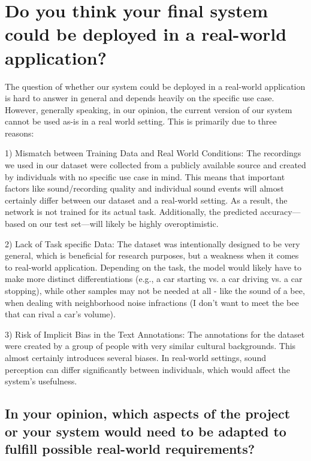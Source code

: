 
\section{Do you think your final system could be deployed in a real-world application?}
\label{sec:real-world application}


The question of whether our system could be deployed in a real-world application is hard to answer in general and depends heavily on the specific use case. However, generally speaking, in our opinion, the current version of our system cannot be used as-is in a real world setting. This is primarily due to three reasons:

1) Mismatch between Training Data and Real World Conditions:
\newline
The recordings we used in our dataset were collected from a publicly available source and created by individuals with no specific use case in mind. This means that important factors like sound/recording quality and individual sound events will almost certainly differ between our dataset and a real-world setting. As a result, the network is not trained for its actual task. Additionally, the predicted accuracy—based on our test set—will likely be highly overoptimistic.

2) Lack of Task specific Data:
\newline
The dataset was intentionally designed to be very general, which is beneficial for research purposes, but a weakness when it comes to real-world application. Depending on the task, the model would likely have to make more distinct differentiations (e.g., a car starting vs. a car driving vs. a car stopping), while other samples may not be needed at all - like the sound of a bee, when dealing with neighborhood noise infractions (I don't want to meet the bee that can rival a car's volume).

3) Risk of Implicit Bias in the Text Annotations:
\newline
The annotations for the dataset were created by a group of people with very similar cultural backgrounds. This almost certainly introduces several biases. In real-world settings, sound perception can differ significantly between individuals, which would affect the system’s usefulness.



\subsection{In your opinion, which aspects of the project or your system would need to be adapted to fulfill possible real-world requirements?}
\label{sec:real-world-app:a}

